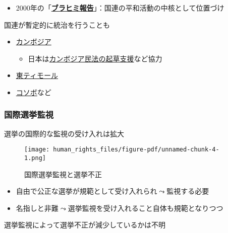 \documentclass[
  xelatex,
  ja=standard]{bxjsarticle}
\providecommand{\tightlist}{%
  \setlength{\itemsep}{0pt}\setlength{\parskip}{0pt}}\usepackage{longtable,booktabs,array}
\begin{document}
\begin{itemize}
\tightlist
\item
  2000年の「\href{https://www.unic.or.jp/files/a_55_305.pdf}{\textbf{ブラヒミ報告}}」：国連の平和活動の中核として位置づけ
\end{itemize}

国連が暫定的に統治を行うことも

\begin{itemize}
\tightlist
\item
  \href{https://www.unic.or.jp/activities/peace_security/action_for_peace/asia_pacific/cambodia/}{カンボジア}

  \begin{itemize}
  \tightlist
  \item
    日本は\href{http://www.moj.go.jp/housouken/houso_houkoku_cambo.html}{カンボジア民法の起草支援}など協力
  \end{itemize}
\item
  \href{https://www.unic.or.jp/activities/peace_security/independence/declaration/east_timor/}{東ティモール}
\item
  \href{https://www.unic.or.jp/activities/peace_security/action_for_peace/europe/kosovo/}{コソボ}など
\end{itemize}

\hypertarget{ux56fdux969bux9078ux6319ux76e3ux8996}{%
\subsubsection{国際選挙監視}\label{ux56fdux969bux9078ux6319ux76e3ux8996}}

選挙の国際的な監視の受け入れは拡大

\begin{figure}[htpb]

{\centering \texttt{[image: human\_rights\_files/figure-pdf/unnamed-chunk-4-1.png]}

}

\caption{国際選挙監視と選挙不正}

\end{figure}

\begin{itemize}
\tightlist
\item
  自由で公正な選挙が規範として受け入れられ\(\leadsto\)監視する必要
\item
  名指しと非難\(\leadsto\)選挙監視を受け入れること自体も規範となりつつ\citep{hyde2011}
\end{itemize}

選挙監視によって選挙不正が減少しているかは不明
\end{document}
